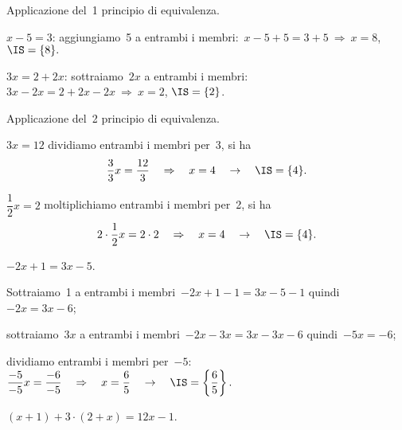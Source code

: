 \begin{exrig}
 \begin{esempio}
Applicazione del~1{\textdegree} principio di equivalenza.

\begin{enumeratea}
\item $x-5=3$:
aggiungiamo~5 a entrambi i membri:~$x-5+5=3+5\:\Rightarrow\: x=8$, $\IS =\{8\}.$
\item $3x=2+2x$: sottraiamo~$2x$ a entrambi i membri:~$3x-2x=2+2x-2x\:\Rightarrow\: x=2$,
$\IS =\{2\}$.
\end{enumeratea}
 \end{esempio}

 \begin{esempio}
 Applicazione del~2{\textdegree} principio di equivalenza.

 \begin{enumeratea}
\item $3x=12$ dividiamo entrambi i membri per~3, si ha
\[\dfrac{3}{3}x=\dfrac{12}{3}\quad\Rightarrow\quad x=4\quad\to\quad\IS =\{4\}.\]
\item $\dfrac{1}{2}x=2$ moltiplichiamo entrambi i membri per~2, si ha
\[2\cdot {\dfrac{1}{2}}x=2\cdot 2\quad\Rightarrow\quad x=4\quad\to\quad\IS =\{4\}.\]
\end{enumeratea}
\end{esempio}

 \begin{esempio}
 $-2x+1=3x-5$.

\begin{enumeratea}
 \item Sottraiamo~1 a entrambi i membri~$-2x+1-1=3x-5-1$ quindi~$-2x=3x-6$;
\item sottraiamo~$3x$ a entrambi i membri~$-2x-3x=3x-3x-6$ quindi~$-5x=-6$;
\item dividiamo entrambi i membri per~$-5$:~$\dfrac{-5}{-5}x=\dfrac{-6}{-5}\quad\Rightarrow\quad x=\dfrac{6}{5}\quad\rightarrow\quad
\IS =\left\{\dfrac{6}{5}\right\}.$
\end{enumeratea}
 \end{esempio}

 \begin{esempio}
$(x+1)+3\cdot (2+x)=12x-1$.


\end{esempio}
\end{exrig}

